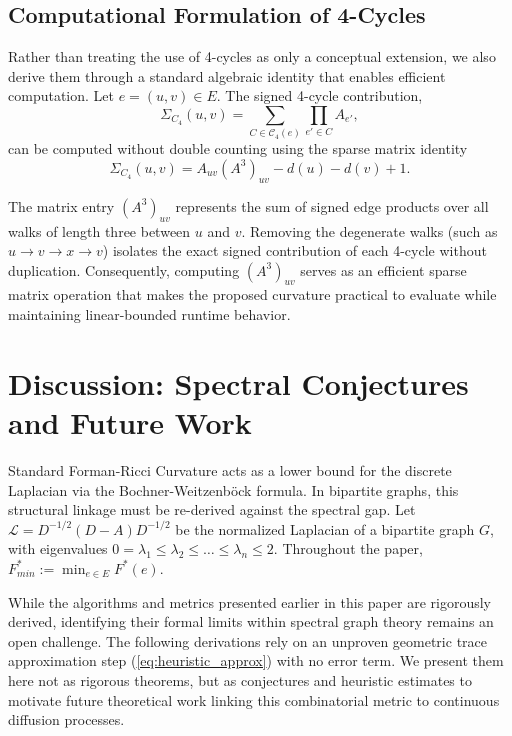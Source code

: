 \documentclass{siuro250211}
\theoremstyle{remark}
\theoremstyle{plain}
\begin{document}
\subsection{Computational Formulation of 4-Cycles} 
Rather than treating the use of 4-cycles as only a conceptual extension, we also derive them through a standard algebraic identity that enables efficient computation. Let $e=(u,v)\in E$. The signed 4-cycle contribution, \[ \Sigma_{C_4}(u,v)=\sum_{C\in\mathcal{C}_4(e)}\prod_{e'\in C}A_{e'}, \] can be computed without double counting using the sparse matrix identity \begin{equation} 
\label{eq:sigma_c4} 
\Sigma_{C_4}(u,v)=A_{uv}(A^3)_{uv}-d(u)-d(v)+1. 
\end{equation} 

The matrix entry $(A^3)_{uv}$ represents the sum of signed edge products over all walks of length three between $u$ and $v$. Removing the degenerate walks (such as $u\rightarrow v\rightarrow x\rightarrow v$) isolates the exact signed contribution of each 4-cycle without duplication. Consequently, computing $(A^3)_{uv}$ serves as an efficient sparse matrix operation that makes the proposed curvature practical to evaluate while maintaining linear-bounded runtime behavior.

\section{Discussion: Spectral Conjectures and Future Work}

Standard Forman-Ricci Curvature acts as a lower bound for the discrete Laplacian via the Bochner-Weitzenb{\"o}ck formula. In bipartite graphs, this structural linkage must be re-derived against the spectral gap. Let $\mathcal{L} = D^{-1/2}(D - A)D^{-1/2}$ be the normalized Laplacian of a bipartite graph $G$, with eigenvalues $0 = \lambda_1 \le \lambda_2 \le \dots \le \lambda_n \le 2$. Throughout the paper, $F_{min}^* := \min_{e \in E} F^*(e)$.

While the algorithms and metrics presented earlier in this paper are rigorously derived, identifying their formal limits within spectral graph theory remains an open challenge. The following derivations rely on an unproven geometric trace approximation step (\cref{eq:heuristic_approx}) with no error term. We present them here not as rigorous theorems, but as conjectures and heuristic estimates to motivate future theoretical work linking this combinatorial metric to continuous diffusion processes.
\end{document}

